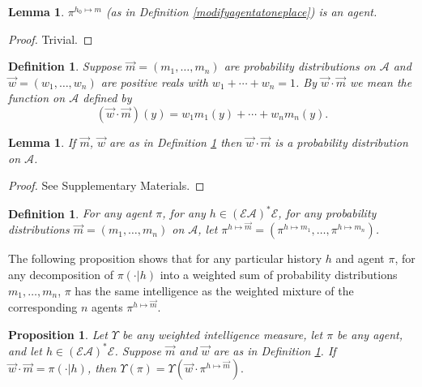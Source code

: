 \documentclass[twoside]{article}
\newtheorem{definition}[theorem]{Definition}
\newtheorem{lemma}[theorem]{Lemma}
\newtheorem{proposition}[theorem]{Proposition}
\begin{document}
\begin{lemma}
    $\pi^{h_0\mapsto m}$ (as in Definition \ref{modifyagentatoneplace})
    is an agent.
\end{lemma}

\begin{proof}
    Trivial.
\end{proof}

\begin{definition}
\label{sumofdistros}
    Suppose $\vec m=(m_1,\ldots,m_n)$ are probability distributions on $\mathcal A$
    and $\vec w=(w_1,\ldots,w_n)$ are positive reals with
    $w_1+\cdots+w_n=1$. By $\vec w\cdot\vec m$ we mean the function
    on $\mathcal A$ defined by
    \[
        (\vec w\cdot\vec m)(y) = w_1m_1(y) + \cdots + w_nm_n(y).
    \]
\end{definition}

\begin{lemma}
\label{wcdotmisaprobabilitydistro}
    If $\vec m$, $\vec w$ are as in Definition \ref{sumofdistros}
    then $\vec w\cdot\vec m$ is a probability distribution on $\mathcal A$.
\end{lemma}

\begin{proof}
    See Supplementary Materials.
\end{proof}

\begin{definition}
    For any agent $\pi$, for any $h\in(\mathcal E\mathcal A)^*\mathcal E$,
    for any probability distributions $\vec m=(m_1,\ldots,m_n)$ on $\mathcal A$,
    let $\pi^{h\mapsto \vec m}=(\pi^{h\mapsto m_1},\ldots,\pi^{h\mapsto m_n})$.
\end{definition}

The following proposition shows that
for any particular history $h$ and agent $\pi$,
for any decomposition of $\pi(\cdot|h)$ into a weighted sum
of probability distributions $m_1,\ldots,m_n$,
$\pi$ has the same intelligence as the weighted mixture of the corresponding $n$ agents
$\pi^{h\mapsto \vec m}$.

\begin{proposition}
\label{longproposition}
    Let $\Upsilon$ be any weighted intelligence measure, let $\pi$ be any agent,
    and let $h\in(\mathcal E\mathcal A)^*\mathcal E$.
    Suppose $\vec m$ and $\vec w$ are as in Definition \ref{sumofdistros}.
    If $\vec w\cdot\vec m = \pi(\cdot|h)$, then
    $
        \Upsilon(\pi)
        =
        \Upsilon(\vec w\cdot \pi^{h\mapsto \vec m}).
    $
\end{proposition}
\end{document}
